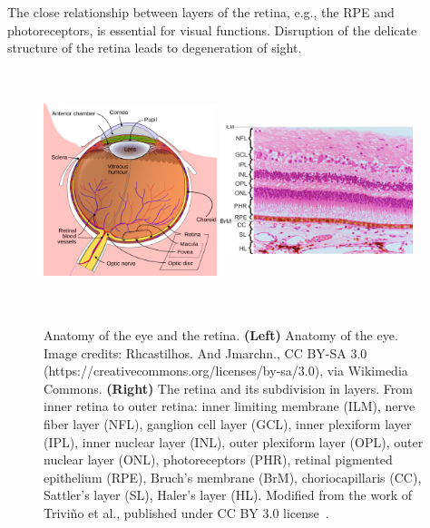\documentclass[12pt,a4paper]{journal}
\begin{document}
The close relationship between layers of the retina, e.g., the RPE and photoreceptors, is essential for visual functions.
Disruption of the delicate structure of the retina leads to degeneration of sight.

\begin{figure}[ht]
  \centering
  \includegraphics[width=0.45\textwidth, height=7cm]{ArchitectureEye} %
  \hfill
  \includegraphics[width=0.50\textwidth, height=7cm]{RetinalLayers}
  \caption{Anatomy of the eye and the retina. \textbf{(Left)} Anatomy of the eye. Image credits: Rhcastilhos. And Jmarchn., CC BY-SA 3.0 (https://creativecommons.org/licenses/by-sa/3.0), via Wikimedia Commons. \textbf{(Right)} The retina and its subdivision in layers. From inner retina to outer retina: inner limiting membrane (ILM), nerve fiber layer (NFL), ganglion cell layer (GCL), inner plexiform layer (IPL), inner nuclear layer (INL), outer plexiform layer (OPL), outer nuclear layer (ONL), photoreceptors (PHR), retinal pigmented epithelium (RPE), Bruch's membrane (BrM), choriocapillaris (CC), Sattler's layer (SL), Haler's layer (HL). Modified from the work of Trivi\~no et al., published under CC BY 3.0 license~\cite{Trivino_2012}.}
  \label{fig:architecture-eye}
\end{figure}
\end{document}
